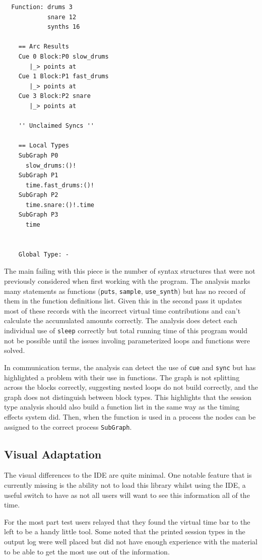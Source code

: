 \documentclass[11pt, abstracton, twoside, titlepage=true]{scrartcl}
\begin{document}
\begin{lstlisting}
  Function: drums 3
            snare 12
            synths 16

    == Arc Results       
    Cue 0 Block:P0 slow_drums
       |_> points at 
    Cue 1 Block:P1 fast_drums
       |_> points at 
    Cue 3 Block:P2 snare
       |_> points at 

    '' Unclaimed Syncs ''   

    == Local Types
    SubGraph P0
      slow_drums:()!
    SubGraph P1
      time.fast_drums:()!
    SubGraph P2
      time.snare:()!.time
    SubGraph P3
      time


    Global Type: -  
\end{lstlisting}

The main failing with this piece is the number of syntax structures that were not 
previously considered when first working with the program. The analysis marks many
statements as functions (\texttt{puts}, \texttt{sample}, \texttt{use\_synth}) but 
has no record of them in the function definitions list. Given this in the second pass 
it updates most of these records with the incorrect virtual time contributions and 
can't calculate the accumulated amounts correctly. The analysis does detect each 
individual use of \texttt{sleep} correctly but total running time of this program 
would not be possible until the issues involing parameterized loops and functions 
were solved.

In communication terms, the analysis can detect the use of \texttt{cue} and 
\texttt{sync} but has highlighted a problem with their use in functions. The graph is 
not splitting across the blocks correctly, suggesting nested loops do not build 
correctly, and the graph does not distinguish between block types. This highlights 
that the session type analysis should also build a function list in the same way 
as the timing effects system did. Then, when the function is used in a process the 
nodes can be assigned to the correct process \texttt{SubGraph}.

\subsection{Visual Adaptation}

The visual differences to the IDE are quite minimal. One notable feature that is 
currently missing is the ability not to load this library whilst using the IDE, a 
useful switch to have as not all users will want to see this information all of the
time. 

For the most part test users relayed that they found the virtual time bar to the 
left to be a handy little tool. Some noted that the printed session types in the 
output log were well placed but did not have enough experience with the material 
to be able to get the most use out of the information. 
\end{document}
